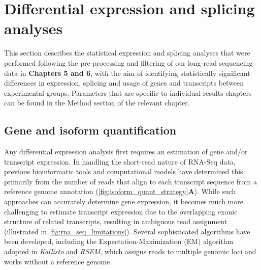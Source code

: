 \section{Differential expression and splicing analyses}

This section describes the statistical expression and splicing analyses that were performed following the pre-processing and filtering of our long-read sequencing data in \textbf{Chapters 5 and 6}, with the aim of identifying statistically significant differences in expression, splicing and usage of genes and transcripts between experimental groups. Parameters that are specific to individual results chapters can be found in the Method section of the relevant chapter. 

\subsection{Gene and isoform quantification}\label{sec: gene_isoform_quant_explained}
Any differential expression analysis first requires an estimation of gene and/or transcript expression. In handling the short-read nature of RNA-Seq data, previous bioinformatic tools and computational models have determined this primarily from the number of reads that align to each transcript sequence from a reference genome annotation\cite{Conesa2016} (\cref{fig:isoform_quant_strategy}\textbf{A}). While such approaches can accurately determine gene expression, it becomes much more challenging to estimate transcript expression due to the overlapping exonic structure of related transcripts, resulting in ambiguous read assignment (illustrated in \cref{fig:rna_seq_limitations}). Several sophisticated algorithms have been developed, including the Expectation-Maximization (EM) algorithm adopted in \textit{Kallisto}\cite{Bray2016} and \textit{RSEM}\cite{Li2011}, which assigns reads to multiple genomic loci and works without a reference genome\cite{Conesa2016}. 

